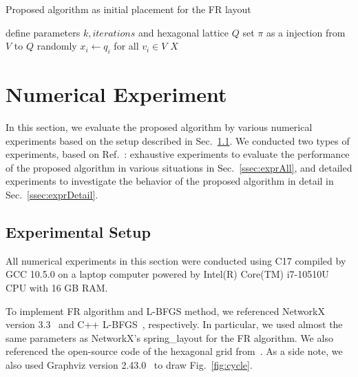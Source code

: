 \documentclass[dvipdfmx,journal]{IEEEtran}
\newcommand{\Cpp}{C\nolinebreak[4]\hspace{-.05em}\raisebox{.4ex}{\relsize{-3}{\textbf{++}}}}
\begin{document}
\begin{algorithm}[ht]
    \caption{Proposed algorithm as initial placement for the FR layout}
    \label{alg:proposed}

    define parameters $k, \textit{iterations}$ and hexagonal lattice $Q$\;
    set $\pi$ as a injection from $V$ to $Q$ randomly\;
    $x_i \gets q_i$ for all $v_i \in V$\;
    \Return $X$
\end{algorithm}

\section{Numerical Experiment} \label{sec:experiment}

In this section, we evaluate the proposed algorithm by various numerical experiments based on the setup described in Sec.~\ref{ssec:setup}.
We conducted two types of experiments, based on Ref.~\cite{8419285}: exhaustive experiments to evaluate the performance of the proposed algorithm in various situations in Sec.~\ref{ssec:exprAll}, and detailed experiments to investigate the behavior of the proposed algorithm in detail in Sec.~\ref{ssec:exprDetail}.

\subsection{Experimental Setup}\label{ssec:setup}

All numerical experiments in this section were conducted using \Cpp17 compiled by GCC 10.5.0 on a laptop computer powered by Intel(R) Core(TM) i7-10510U CPU with 16 GB RAM.

To implement FR algorithm and L-BFGS method, we referenced NetworkX version 3.3~\cite{hagberg2008exploring} and C++ L-BFGS~\cite{qiuYixuanLBFGSpp2024,okazakiChokkanLiblbfgs2024}, respectively. In particular, we used almost the same parameters as NetworkX's \textsf{spring\_layout} for the FR algorithm.
We also referenced the open-source code of the hexagonal grid from~\cite{patelHexagonalGrids2013}.
As a side note, we also used Graphviz version 2.43.0~\cite{ellsonGraphvizOpenSource2002} to draw Fig.~\ref{fig:cycle}.
\end{document}
